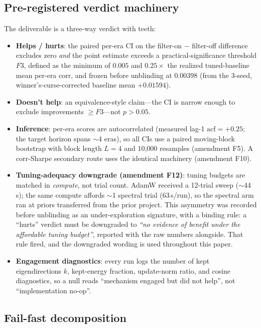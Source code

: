 \subsection{Pre-registered verdict machinery}
\label{sec:method-verdict}

The deliverable is a three-way verdict with teeth:
\begin{itemize}
  \item \textbf{Helps / hurts}: the paired per-era CI on the
    filter-on $-$ filter-off difference excludes zero \emph{and} the point
    estimate exceeds a practical-significance threshold $F3$, defined
    as the minimum of $0.005$ and $0.25\times$ the realized tuned-baseline
    mean per-era corr, and frozen before unblinding at $\mathbf{0.00398}$
    (from the 3-seed, winner's-curse-corrected baseline mean $+0.01594$).
  \item \textbf{Doesn't help}: an equivalence-style claim---the CI is
    narrow enough to exclude improvements $\geq F3$---not $p > 0.05$.
  \item \textbf{Inference}: per-era scores are autocorrelated (measured
    lag-1 $\mathrm{acf} = +0.25$; the target horizon spans $\sim$4 eras),
    so all CIs use a paired moving-block bootstrap with block length
    $L = 4$ and 10{,}000 resamples (amendment F5). A corr-Sharpe secondary
    route uses the identical machinery (amendment F10).
  \item \textbf{Tuning-adequacy downgrade (amendment F12)}: tuning budgets
    are matched in \emph{compute}, not trial count. AdamW received a
    12-trial sweep ($\sim$44\,s); the same compute affords $\sim$1 spectral
    trial (63\,s/run), so the spectral arm ran at priors transferred from
    the prior project. This asymmetry was recorded before unblinding as an
    under-exploration signature, with a binding rule: a ``hurts'' verdict
    must be downgraded to \emph{``no evidence of benefit under the
    affordable tuning budget''}, reported with the raw numbers alongside.
    That rule fired, and the downgraded wording is used throughout this
    paper.
  \item \textbf{Engagement diagnostics}: every run logs the number of kept
    eigendirections $k$, kept-energy fraction, update-norm ratio, and
    cosine diagnostics, so a null reads ``mechanism engaged but did not
    help'', not ``implementation no-op''.
\end{itemize}

\subsection{Fail-fast decomposition}
\label{sec:method-decomposition}


